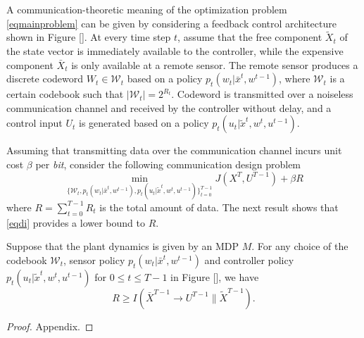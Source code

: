 A communication-theoretic meaning of the optimization problem \eqref{eqmainproblem} can be given by considering a feedback control architecture shown in Figure []. 
At every time step $t$, assume that the free component $\tilde{X}_t$ of the state vector is immediately available to the controller, while the expensive component $\bar{X}_t$ is only available at a remote sensor. The remote sensor produces a discrete codeword $W_t\in\mathcal{W}_t$ based on a policy $p_t(w_t|\bar{x}^t, w^{t-1})$, where $\mathcal{W}_t$ is a certain codebook such that $|\mathcal{W}_t|=2^{R_t}$. Codeword is transmitted over a noiseless communication channel and received by the controller without delay, and a control input $U_t$ is generated based on a policy $p_t(u_t|\tilde{x}^t, w^t, u^{t-1})$. 



Assuming that transmitting data over the communication channel incurs unit cost $\beta$ per \emph{bit}, consider the following communication design problem
\begin{equation}
\min_{\{\mathcal{W}_t, p_t(w_t|\bar{x}^t, w^{t-1}), p_t(u_t|\tilde{x}^t, w^t, u^{t-1}) \}_{t=0}^{T-1}}  J(X^T, U^{T-1}) +\beta R \label{eqcommproblem}
\end{equation}
where $R=\sum_{t=0}^{T-1}R_t$ is the total amount of data. 
The next result shows that \eqref{eqdi} provides a lower bound to $R$.
\begin{theorem}
Suppose that the plant dynamics is given by an MDP $M$. For any choice of the codebook $\mathcal{W}_t$, sensor policy $p_t(w_t|\bar{x}^t, w^{t-1})$ and controller policy $p_t(u_t|\tilde{x}^t, w^t, u^{t-1})$ for $0\leq t\leq T-1$ in Figure [], we have
\[
R \geq I(\bar{X}^{T-1}\rightarrow U^{T-1}\| \tilde{X}^{T-1}).
\]
\end{theorem}
\begin{proof}
Appendix.
\end{proof}





